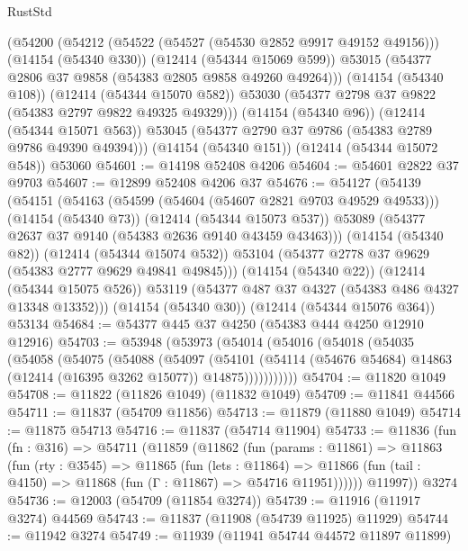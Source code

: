 \begin{lexlean}{RustStd}
\begin{coremodule}
      (@54200
        (@54212
          (@54522 (@54527 (@54530 @2852 @9917 @49152 @49156)))
          (@14154 (@54340 @330))
          (@12414 (@54344 @15069 @599))
          @53015
          (@54377 @2806 @37 @9858 (@54383 @2805 @9858 @49260 @49264)))
        (@14154 (@54340 @108))
        (@12414 (@54344 @15070 @582))
        @53030
        (@54377 @2798 @37 @9822 (@54383 @2797 @9822 @49325 @49329)))
      (@14154 (@54340 @96))
      (@12414 (@54344 @15071 @563))
      @53045
      (@54377 @2790 @37 @9786 (@54383 @2789 @9786 @49390 @49394)))
    (@14154 (@54340 @151))
    (@12414 (@54344 @15072 @548))
    @53060
@54601 := @14198 @52408 @4206
@54604 := @54601 @2822 @37 @9703
@54607 := @12899 @52408 @4206 @37
@54676 := @54127
    (@54139
      (@54151
        (@54163
          (@54599 (@54604 (@54607 @2821 @9703 @49529 @49533)))
          (@14154 (@54340 @73))
          (@12414 (@54344 @15073 @537))
          @53089
          (@54377 @2637 @37 @9140 (@54383 @2636 @9140 @43459 @43463)))
        (@14154 (@54340 @82))
        (@12414 (@54344 @15074 @532))
        @53104
        (@54377 @2778 @37 @9629 (@54383 @2777 @9629 @49841 @49845)))
      (@14154 (@54340 @22))
      (@12414 (@54344 @15075 @526))
      @53119
      (@54377 @487 @37 @4327 (@54383 @486 @4327 @13348 @13352)))
    (@14154 (@54340 @30))
    (@12414 (@54344 @15076 @364))
    @53134
@54684 := @54377 @445 @37 @4250 (@54383 @444 @4250 @12910 @12916)
@54703 := @53948
    (@53973
      (@54014
        (@54016
          (@54018
            (@54035
              (@54058
                (@54075
                  (@54088
                    (@54097
                      (@54101
                        (@54114
                          (@54676 @54684)
                          @14863
                          (@12414 (@16395 @3262 @15077))
                          @14875)))))))))))
@54704 := @11820 @1049
@54708 := @11822 (@11826 @1049) (@11832 @1049)
@54709 := @11841 @44566
@54711 := @11837 (@54709 @11856)
@54713 := @11879 (@11880 @1049)
@54714 := @11875 @54713
@54716 := @11837 (@54714 @11904)
@54733 := @11836
    (fun (fn : @316) =>
    @54711
      (@11859
        (@11862
          (fun (params : @11861) =>
          @11863
            (fun (rty : @3545) =>
            @11865
              (fun (lets : @11864) =>
              @11866 (fun (tail : @4150) => @11868 (fun (Γ : @11867) => @54716 @11951))))))
        @11997))
    @3274
@54736 := @12003 (@54709 (@11854 @3274))
@54739 := @11916 (@11917 @3274) @44569
@54743 := @11837 (@11908 (@54739 @11925) @11929)
@54744 := @11942 @3274
@54749 := @11939 (@11941 @54744 @44572 @11897 @11899)

\end{coremodule}
\end{lexlean}
